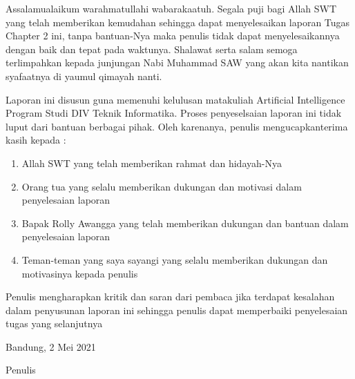 \begin{acknowledgements}
Assalamualaikum warahmatullahi wabarakaatuh. Segala puji bagi Allah SWT yang telah memberikan kemudahan sehingga dapat menyelesaikan laporan Tugas Chapter 2 ini, tanpa bantuan-Nya maka penulis tidak dapat menyelesaikannya dengan baik dan tepat pada waktunya. Shalawat serta salam semoga terlimpahkan kepada junjungan Nabi Muhammad SAW yang akan kita nantikan syafaatnya di yaumul qimayah nanti.

Laporan ini disusun guna memenuhi kelulusan matakuliah Artificial Intelligence Program Studi DIV Teknik Informatika. Proses penyeselsaian laporan ini tidak luput dari bantuan berbagai pihak. Oleh karenanya, penulis mengucapkanterima kasih kepada :
\begin{enumerate}

\item Allah SWT yang telah memberikan rahmat dan hidayah-Nya
\item Orang tua yang selalu memberikan dukungan dan motivasi dalam penyelesaian laporan
\item Bapak Rolly Awangga yang telah memberikan dukungan dan bantuan dalam penyelesaian laporan
\item Teman-teman yang saya sayangi yang selalu memberikan dukungan dan motivasinya kepada penulis

\end{enumerate}

Penulis mengharapkan kritik dan saran dari pembaca jika terdapat kesalahan dalam penyusunan laporan ini sehingga penulis dapat memperbaiki penyelesaian tugas yang selanjutnya

\begin{raggedleft}

Bandung, 2 Mei 2021

Penulis

\end{raggedleft}
\end{acknowledgements}